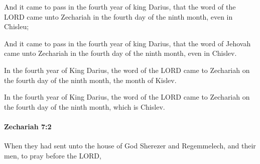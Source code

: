 			And it came to pass in the fourth year of king Darius, that the word of the LORD came unto Zechariah in the fourth day of the ninth month, even in Chisleu;

			\begin{versebox}
					\item[BHS] 
					\item[LXX] 
					\item[ASV] And it came to pass in the fourth year of king Darius, that the word of Jehovah came unto Zechariah in the fourth day of the ninth month, even in Chislev.
					\item[NIV] In the fourth year of King Darius, the word of the LORD came to Zechariah on the fourth day of the ninth month, the month of Kislev.
					\item[NRSV] In the fourth year of King Darius, the word of the LORD came to Zechariah on the fourth day of the ninth month, which is Chislev.
			\end{versebox}

		\paragraph{Zechariah 7:2} %
			\label{ZECHARIAH-7-2}

			When they had sent unto the house of God Sherezer and Regemmelech, and their men, to pray before the LORD,

